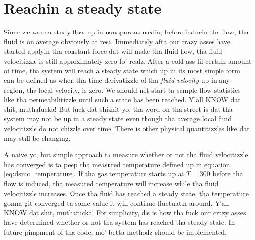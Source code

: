 \section{Reachin a steady state}
\label{sec:dsmc_steady_state}
Since we wanna study flow up in nanoporous media, before inducin tha flow, tha fluid is on average obviously at rest. Immediately afta our crazy asses have started applyin tha constant force dat will make tha fluid flow, tha fluid velocitizzle is still approximately zero fo' realz. After a cold-ass lil certain amount of time, tha system will reach a steady state which up in its most simple form can be defined as when tha time derivatizzle of tha \textit{fluid velocity} up in any region, tha local velocity, is zero. We should not start ta sample flow statistics like tha permeabilitizzle until such a state has been reached. Y'all KNOW dat shit, muthafucka! But fuck dat shiznit yo, tha word on tha street is dat tha system may not be up in a steady state even though tha average local fluid velocitizzle do not chizzle over time. There is other physical quantitizzles like dat may still be changing.

A naive yo, but simple approach ta measure whether or not tha fluid velocitizzle has converged is ta peep tha measured temperature defined up in equation \eqref{eq:dsmc_temperature}. If tha gas temperature starts up at $T= $\unit{300}{\kelvin} before tha flow is induced, tha measured temperature will increase while tha fluid velocitizzle increases. Once tha fluid has reached a steady state, tha temperature gonna git converged ta some value it will continue fluctuatin around. Y'all KNOW dat shit, muthafucka! For simplicity, dis is how tha fuck our crazy asses have determined whether or not tha system has reached tha steady state. In future pimpment of tha code, mo' betta methodz should be implemented.
